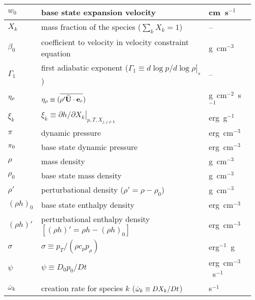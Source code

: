 \begin{center}
\begin{longtable}{|l|p{4.0in}|l|}
\hline
$w_0$   & base state expansion velocity              & cm~s$^{-1}$ \\
\hline
$X_k$   & mass fraction of the species ($\sum_k X_k = 1$) & -- \\
\hline
$\beta_0$ & coefficient to velocity
            in velocity constraint equation  & g~cm$^{-3}$ \\
\hline
$\Gamma_1$ & first adiabatic exponent ($\Gamma_1 \equiv \left . d \log p/d \log \rho \right |_s$) & -- \\
\hline
$\eta_{\rho}$ & $\eta_{\rho} \equiv (\overline{ \rho' \widetilde{{\bf U}} \cdot \mathbf{e}_r})$ & g~cm$^{-2}$~s$^{-1}$ \\
\hline
$\xi_k$ & $\xi_k \equiv \left . \partial h / \partial X_k \right |_{p,T,X_{j,j\ne k}}$ & erg~g$^{-1}$ \\
\hline 
$\pi$   & dynamic pressure & erg~cm$^{-3}$ \\
\hline
$\pi_0$ & base state dynamic pressure & erg~cm$^{-3}$ \\
\hline
$\rho$  & mass density  & g~cm$^{-3}$ \\
\hline
$\rho_0$  & base state mass density  & g~cm$^{-3}$ \\
\hline
$\rho'$  & perturbational density ($\rho' = \rho - \rho_0$) & g~cm$^{-3}$ \\
\hline
$(\rho h)_0$ & base state enthalpy density & erg~cm$^{-3}$  \\
\hline
$(\rho h)'$ & perturbational enthalpy density 
              $ \left [(\rho h)' = \rho h - (\rho h)_0 \right ]$ & erg~cm$^{-3}$  \\
\hline
$\sigma$ & $\sigma \equiv p_T/(\rho c_p p_\rho)$ & erg$^{-1}$~g \\
\hline
$\psi$  & $\psi \equiv D_0 p_0/Dt$ & erg~cm$^{-3}$~s$^{-1}$ \\
\hline
$\dot{\omega}_k$ & creation rate for species $k$ ($\dot{\omega}_k \equiv DX_k/Dt$) & s$^{-1}$ \\
\end{longtable}
\end{center}
%
\renewcommand{\arraystretch}{1.0}


